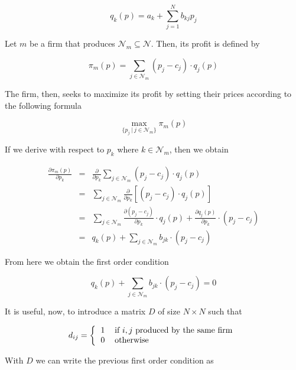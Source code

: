 \documentclass[12pt]{article}
\begin{document}
\begin{equation*}
q_k(p) = a_k + \sum_{j=1}^N b_{kj}p_j
\end{equation*}

Let $m$ be a firm that produces $\mathcal{N}_m \subseteq \mathcal{N}$. Then, its profit is defined by

\begin{equation*}
\pi_m(p) = \sum_{j \in \mathcal{N}_m} (p_j - c_j)\cdot q_j(p)
\end{equation*}

The firm, then, seeks to maximize its profit by setting their prices according to the following formula

\begin{equation*}
\max_{\{p_j ~ | ~ j \in \mathcal{N}_m\}} \pi_m(p)
\end{equation*}

If we derive with respect to $p_k$ where $k\in \mathcal{N}_m$, then we obtain

\begin{eqnarray*}
\frac{\partial\pi_m(p)}{\partial p_k} &=& \frac{\partial}{\partial p_k} \sum_{j \in \mathcal{N}_m} (p_j - c_j) \cdot q_j(p) \\
&=& \sum_{j \in \mathcal{N}_m} \frac{\partial}{\partial p_k} \left[(p_j - c_j) \cdot q_j(p)\right] \\
&=& \sum_{j \in \mathcal{N}_m} \frac{\partial (p_j - c_j)}{\partial p_k} \cdot q_j(p) + \frac{\partial q_j(p)}{\partial p_k} \cdot (p_j - c_j)\\
&=& q_k(p) + \sum_{j \in \mathcal{N}_m} b_{jk} \cdot (p_j - c_j) 
\end{eqnarray*}

From here we obtain the first order condition

\begin{equation*}
q_k(p) + \sum_{j \in \mathcal{N}_m} b_{jk} \cdot (p_j - c_j) = 0
\end{equation*}

It is useful, now, to introduce a matrix $D$ of size $N \times N$ such that

\begin{equation*}
d_{ij} = \left\{
\begin{tabular}{ll}
1 & if $i,j$ produced by the same firm\\
0 & otherwise
\end{tabular}\right.
\end{equation*}

With $D$ we can write the previous first order condition as
\end{document}
